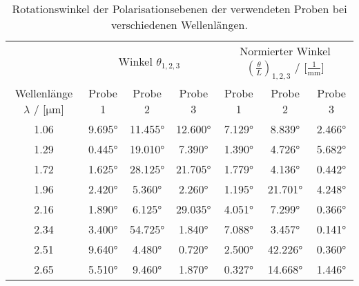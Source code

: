 \begin{table}

  \centering
\begin{tabular}{c|c|c|c|c|c|c}

  \toprule
  & \multicolumn{3}{|c|}{Winkel $\theta_{1,2,3}$} & \multicolumn{3}{|c|}{Normierter Winkel $({\frac{\theta}{L}})_{1,2,3}$ / [$\frac{1}{\text{mm}}$]} \\
  Wellenlänge $\lambda$ / [$\si{\micro}$m] & Probe 1 & Probe 2 & Probe 3 & Probe 1 & Probe 2 & Probe 3 \\

  \midrule
  1.06 & 9.695° & 11.455° & 12.600° & 7.129° &  8.839°  & 2.466°  \\

  1.29 & 0.445° & 19.010° &  7.390° & 1.390° &  4.726°  & 5.682°  \\
  1.72 & 1.625° & 28.125° & 21.705° & 1.779° &  4.136°  & 0.442° \\
  1.96 & 2.420° &  5.360° &  2.260° & 1.195° & 21.701°  & 4.248°  \\
  2.16 & 1.890° &  6.125° & 29.035° & 4.051° &  7.299°  & 0.366° \\

  2.34 & 3.400° & 54.725° &  1.840° & 7.088° &  3.457°  & 0.141° \\
  2.51 & 9.640° &  4.480° &  0.720° & 2.500° & 42.226°  & 0.360° \\
  2.65 & 5.510° &  9.460° &  1.870° & 0.327° & 14.668°  & 1.446°  \\
  \bottomrule
\end{tabular}
\caption{Rotationswinkel der Polarisationsebenen der verwendeten Proben bei verschiedenen Wellenlängen.}

\label{tab:winkel}
\end{table}

